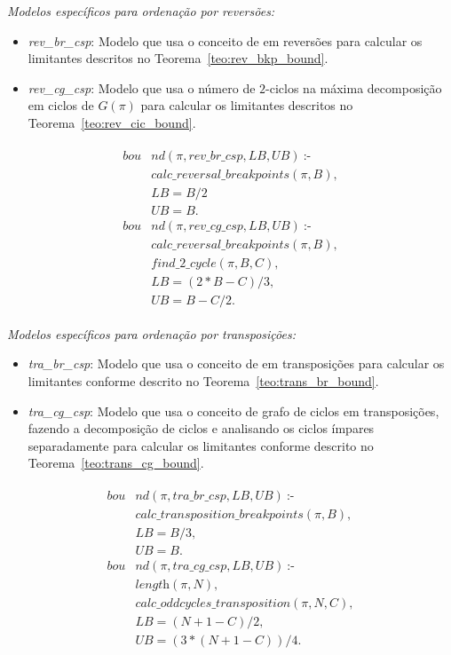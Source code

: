 \textit{Modelos específicos para ordenação por reversões:}
\begin{itemize}
\item{\textit{rev\_br\_csp}: 
Modelo que usa o conceito de \bkp{} em reversões para calcular os
limitantes descritos no Teorema~\ref{teo:rev_bkp_bound}.}
\item{\textit{rev\_cg\_csp}:
Modelo que usa o número de $2$-ciclos na máxima decomposição em ciclos
de $G(\pi)$ para calcular os limitantes descritos no
Teorema~\ref{teo:rev_cic_bound}.}
\end{itemize}
\begin{align}
  \label{bound_rev}
  \begin{split}
  \textit{bou}&\textit{nd}(\pi, rev\_br\_csp, LB, UB)~\text{:-}  \\
  &\textit{calc\_reversal\_breakpoints}(\pi, B), \\
  &LB = B / 2  \\ %
  &UB = B.  \\
  \textit{bou}&\textit{nd}(\pi, rev\_cg\_csp, LB, UB)~\text{:-}  \\
  &\textit{calc\_reversal\_breakpoints}(\pi, B), \\
  &\textit{find\_2\_cycle}(\pi, B, C), \\
  &LB = (2 * B - C) / 3 ,   \\
  &UB = B - C / 2.
  \end{split}
\end{align}

\textit{Modelos específicos para ordenação por transposições:}
\begin{itemize}
\item{\textit{tra\_br\_csp}: 
Modelo que usa o conceito de \bkp{} em transposições para calcular os
limitantes conforme descrito no Teorema~\ref{teo:trans_br_bound}.}
\item{\textit{tra\_cg\_csp}:
Modelo que usa o conceito de grafo de ciclos em transposições, fazendo
a decomposição de ciclos e analisando os ciclos ímpares separadamente
para calcular os limitantes conforme descrito no
Teorema~\ref{teo:trans_cg_bound}.}
\end{itemize}
\begin{align}
  \label{bound_tra}
  \begin{split}
  \textit{bou}&\textit{nd}(\pi, tra\_br\_csp, LB, UB)~\text{:-} \\
  &\textit{calc\_transposition\_breakpoints}(\pi, B), \\
  &LB = B / 3,  \\ %
  &UB = B.   \\
  \textit{bou}&\textit{nd}(\pi, tra\_cg\_csp, LB, UB)~\text{:-} \\
  &\textit{length}(\pi, N), \\
  &\textit{calc\_oddcycles\_transposition}(\pi, N, C), \\
  &LB = (N + 1 - C) / 2, \\ 
  &UB = (3 * (N + 1 - C)) / 4.
  \end{split}
\end{align}

